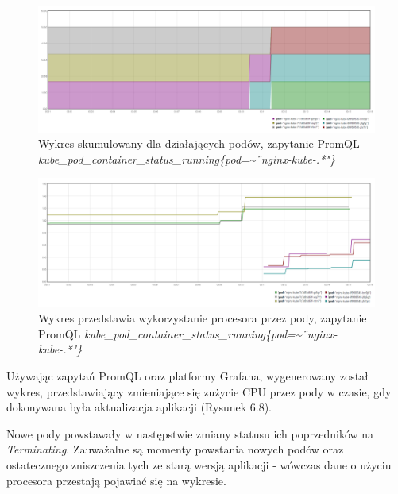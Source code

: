         \begin{figure}[H]
            \centering
            \includegraphics[width=1\textwidth]{img/roll3.png}
            \caption{Wykres skumulowany dla działających podów, zapytanie PromQL \textit{kube\_pod\_container\_status\_running\{pod=\textasciitilde\"\ nginx-kube-.*"\}}}
        \end{figure}
        
        \begin{figure}[h]
            \centering
            \includegraphics[width=1\textwidth]{img/roll5.png}
            \caption{Wykres przedstawia wykorzystanie procesora przez pody, zapytanie PromQL \textit{kube\_pod\_container\_status\_running\{pod=\textasciitilde\"\ nginx-kube-.*"\}}}
        \end{figure}
\fi

Używając zapytań PromQL oraz platformy Grafana, wygenerowany został wykres, przedstawiający zmieniające się zużycie CPU przez pody w czasie, gdy dokonywana była aktualizacja aplikacji (Rysunek 6.8). 

Nowe pody powstawały w następstwie zmiany statusu ich poprzedników na \textit{Terminating}. Zauważalne są momenty powstania nowych podów oraz ostatecznego zniszczenia tych ze starą wersją aplikacji - wówczas dane o użyciu procesora przestają pojawiać się na wykresie.

